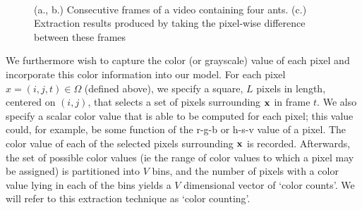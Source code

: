 \documentclass[smallcondensed, final]{svjour3}
\begin{document}
\begin{figure}
  \\
  \caption{(a., b.) Consecutive frames of a video containing four ants. (c.) Extraction results produced by taking the pixel-wise difference between these frames}
  \label{fig:img_and_framediff}
\end{figure}

We furthermore wish to capture the color (or grayscale) value of each pixel and incorporate this color information into our model. For each pixel $x = (i, j, t) \in \Omega$ (defined above), we specify a square, $L$ pixels in length, centered on $(i, j)$, that selects a set of pixels surrounding $\bold{x}$ in frame $t$. We also specify a scalar color value that is able to be computed for each pixel; this value could, for example, be some function of the r-g-b or h-s-v value of a pixel. The color value of each of the selected pixels surrounding $\bold{x}$ is recorded. Afterwards, the set of possible color values (ie the range of color values to which a pixel may be assigned) is partitioned into $V$ bins, and the number of pixels with a color value lying in each of the bins yields a $V$ dimensional vector of `color counts'. We will refer to this extraction technique as `color counting'.
\end{document}
